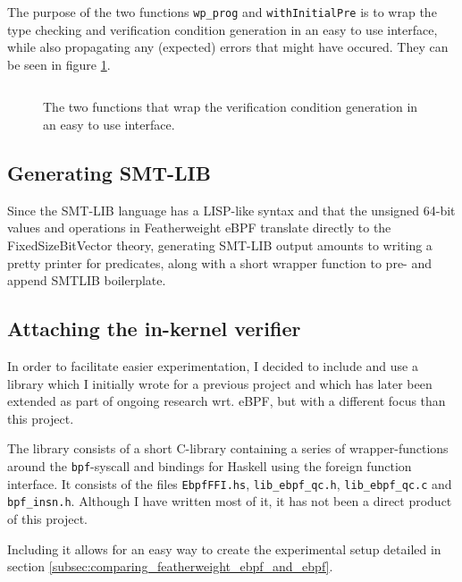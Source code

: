 The purpose of the two functions \texttt{wp\_prog} and \texttt{withInitialPre} is to wrap the type checking and verification condition generation in an easy to use interface, while also propagating any (expected) errors that might have occured. They can be seen in figure \ref{snip:wp_prog_wrap}.

\begin{figure}[ht]
  \centering
\inputminted[linenos,breaklines]{haskell}{snippets/wp_prog_wrap.hs}
  \caption{The two functions that wrap the verification condition generation in an easy to use interface.}
  \label{snip:wp_prog_wrap}
\end{figure}


\subsection{Generating SMT-LIB}
\label{subsec:generating_smt-lib}

Since the SMT-LIB language has a LISP-like syntax and that the unsigned 64-bit values and operations in Featherweight eBPF translate directly to the FixedSizeBitVector theory, generating SMT-LIB output amounts to writing a pretty printer for predicates, along with a short wrapper function to pre- and append SMTLIB boilerplate.



\subsection{Attaching the in-kernel verifier}
\label{subsec:attaching_the_in-kernel_verifier}

In order to facilitate easier experimentation, I decided to include and use a library which I initially wrote for a previous project\cite{ebpf-fuzz} and which has later been extended as part of ongoing research wrt. eBPF, but with a different focus than this project.

The library consists of a short C-library containing a series of wrapper-functions around the \texttt{bpf}-syscall and bindings for Haskell using the foreign function interface.
It consists of the files \verb!EbpfFFI.hs!, \verb!lib_ebpf_qc.h!, \verb!lib_ebpf_qc.c! and \verb!bpf_insn.h!.
Although I have written most of it, it has not been a direct product of this project.

Including it allows for an easy way to create the experimental setup detailed in section \ref{subsec:comparing_featherweight_ebpf_and_ebpf}.







